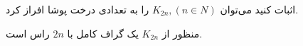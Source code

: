 \begin{PROBLEM}
	\p
	اثبات کنید می‌توان 
	$K_{2n}, (n \in N)$
	را به تعدادی درخت پوشا افراز کرد.

	منظور از 
	$K_{2n}$
	یک گراف کامل با 
	$2n$
	راس است.
	\SOLUTION{
		\p

	}
\end{PROBLEM}